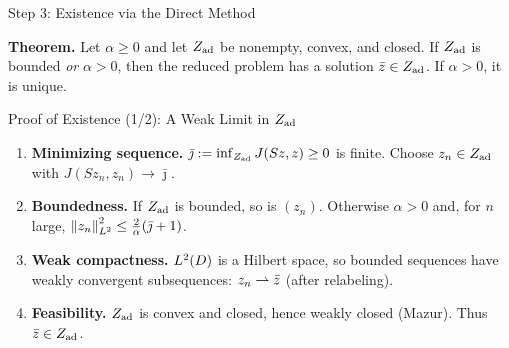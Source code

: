 \documentclass[main.tex]{subfiles}
\begin{document}
\begin{frame}{Step 3: Existence via the Direct Method}
  \begin{qbox}
    \textbf{Theorem.} Let $\alpha \ge 0$ and let $Z_{\rm ad}$ be nonempty, convex, and closed. If $Z_{\rm ad}$ is bounded \emph{or} $\alpha > 0$, then the reduced problem has a solution $\bar z \in Z_{\rm ad}$. If $\alpha > 0$, it is unique.
  \end{qbox}


\end{frame}

\begin{frame}{Proof of Existence (1/2): A Weak Limit in $Z_{\rm ad}$}
  \begin{hlbox}
    \begin{enumerate}
      \item<1-> \textbf{Minimizing sequence.} $\bar\jmath := \inf_{Z_{\rm ad}} J(Sz,z) \ge 0$ is finite. Choose $z_n \in Z_{\rm ad}$ with $J(Sz_n,z_n) \to \bar\jmath$.
      \item<2-> \textbf{Boundedness.} If $Z_{\rm ad}$ is bounded, so is $(z_n)$. Otherwise $\alpha > 0$ and, for $n$ large,
        $\left\lVert z_n \right\rVert_{L^2}^2 \le \tfrac{2}{\alpha}(\bar\jmath + 1)$.
      \item<3-> \textbf{Weak compactness.} $L^2(D)$ is a Hilbert space, so bounded sequences have weakly convergent subsequences: $z_n \rightharpoonup \bar z$ (after relabeling).
      \item<4-> \textbf{Feasibility.} $Z_{\rm ad}$ is convex and closed, hence weakly closed (Mazur). Thus $\bar z \in Z_{\rm ad}$.
    \end{enumerate}
  \end{hlbox}

\end{frame}
\end{document}
